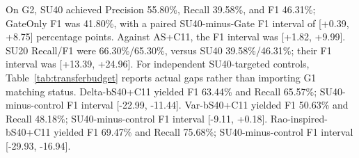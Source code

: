 On G2, SU40 achieved Precision 55.80\%, Recall 39.58\%, and F1 46.31\%; GateOnly F1 was 41.80\%, with a paired SU40-minus-Gate F1 interval of [+0.39, +8.75] percentage points. Against AS+C11, the F1 interval was [+1.82, +9.99]. SU20 Recall/F1 were 66.30\%/65.30\%, versus SU40 39.58\%/46.31\%; their F1 interval was [+13.39, +24.96]. For independent SU40-targeted controls, Table~\ref{tab:transferbudget} reports actual gaps rather than importing G1 matching status. Delta-bS40+C11 yielded F1 63.44\% and Recall 65.57\%; SU40-minus-control F1 interval [-22.99, -11.44]. Var-bS40+C11 yielded F1 50.63\% and Recall 48.18\%; SU40-minus-control F1 interval [-9.11, +0.18]. Rao-inspired-bS40+C11 yielded F1 69.47\% and Recall 75.68\%; SU40-minus-control F1 interval [-29.93, -16.94].
